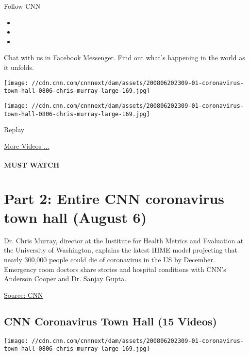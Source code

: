Follow CNN

\begin{itemize}
\item
\item
\item
\end{itemize}

Chat with us in Facebook Messenger. Find out what's happening in the
world as it unfolds.

\texttt{[image: //cdn.cnn.com/cnnnext/dam/assets/200806202309-01-coronavirus-town-hall-0806-chris-murray-large-169.jpg]}

\texttt{[image: //cdn.cnn.com/cnnnext/dam/assets/200806202309-01-coronavirus-town-hall-0806-chris-murray-large-169.jpg]}\href{javascript:void(0);}{}

Replay

\href{/videos}{More Videos ...}

\hypertarget{must-watch}{%
\paragraph{MUST WATCH}\label{must-watch}}

\hypertarget{part-2-entire-cnn-coronavirus-town-hall-august-6}{%
\section{Part 2: Entire CNN coronavirus town hall (August
6)}\label{part-2-entire-cnn-coronavirus-town-hall-august-6}}

Dr. Chris Murray, director at the Institute for Health Metrics and
Evaluation at the University of Washington, explains the latest IHME
model projecting that nearly 300,000 people could die of coronavirus in
the US by December. Emergency room doctors share stories and hospital
conditions with CNN's Anderson Cooper and Dr. Sanjay Gupta.

\href{https://www.cnn.com/}{Source: CNN}

\hypertarget{cnn-coronavirus-town-hall-15-videos}{%
\subsection{CNN Coronavirus Town Hall (15
Videos)}\label{cnn-coronavirus-town-hall-15-videos}}

\href{/videos/health/2020/08/06/entire-august-6-coronavirus-town-hall-part-2-sot-vpx.cnn}{}

\texttt{[image: //cdn.cnn.com/cnnnext/dam/assets/200806202309-01-coronavirus-town-hall-0806-chris-murray-large-169.jpg]}

